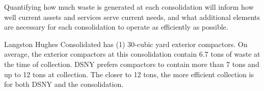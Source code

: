 
    Quantifying how much waste is generated at each consolidation will inform how well current assets and services serve current needs, and what additional elements are necessary for each consolidation to operate as efficiently as possible.
    
    Langston Hughes Consolidated has (1) 30-cubic yard exterior compactors. On average, the exterior compactors at this consolidation contain 6.7 tons of waste at the time of collection. DSNY prefers compactors to contain more than 7 tons and up to 12 tons at collection. The closer to 12 tons, the more efficient collection is for both DSNY and the consolidation.